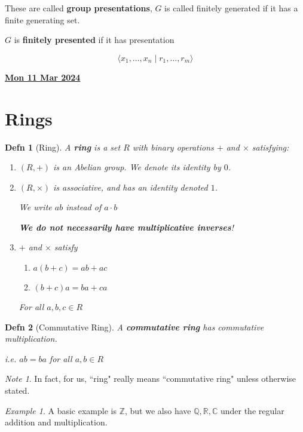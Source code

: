 \documentclass[12pt]{article}
\renewcommand{\date}[1]{\underline{\bf #1}}
\def\Z{{\mathbb Z}}
\def\Q{{\mathbb Q}}
\def\R{{\mathbb R}}
\def\C{{\mathbb C}}
\newcommand{\lr}[1]{\langle #1 \rangle}
\newtheorem{definition}{Defn}
\theoremstyle{remark}
\theoremstyle{remark}
\theoremstyle{remark}
\newtheorem{example}{Example}
\theoremstyle{remark}
\theoremstyle{remark}
\newtheorem*{note}{Note}
\begin{document}
These are called {\bf group presentations}, $G$ is called finitely generated if
it has a finite generating set.

$G$ is {\bf finitely presented} if it has presentation

\[
  \lr {x_1, \dots, x_n \mid r_1, \dots, r_m }
\]

\date{Mon 11 Mar 2024}

\section{Rings}

\begin{definition}[Ring]
  A {\bf ring} is a set $R$ with binary operations $+$ and $\times$ satisfying:
  \begin{enumerate}
    \item $(R, +)$ is an Abelian group. We denote its identity by $0$.
    \item $(R, \times)$ is associative, and has an identity denoted $1$.

      We write $ab$ instead of $a \cdot b$

      {\bf We do not necessarily have multiplicative inverses}!
    \item $+$ and $\times$ satisfy
      \begin{enumerate}
        \item $a(b + c) = ab + ac$
        \item $(b + c)a = ba + ca$
      \end{enumerate}

      For all $a, b, c \in R$
  \end{enumerate}
\end{definition}

\begin{definition}[Commutative Ring]
  A {\bf commutative ring} has commutative multiplication.

  i.e. $ab = ba$ for all $a, b \in R$
\end{definition}

\begin{note}
  In fact, for us, ``ring" really means ``commutative ring" unless otherwise
  stated.
\end{note}

\begin{example}
  A basic example is $\Z$, but we also have $\Q, \R, \C$ under the regular
  addition and multiplication.
\end{example}
\end{document}
